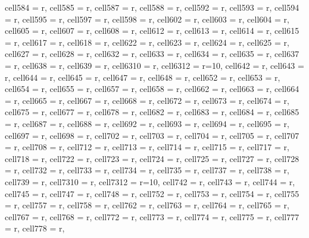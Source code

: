\begin{longtblr}[
  caption = {Linear model estimating all the considered metrics in every alternative scenario.}
]
{  cell{58}{4} = {r},
  cell{58}{5} = {r},
  cell{58}{7} = {r},
  cell{58}{8} = {r},
  cell{59}{2} = {r},
  cell{59}{3} = {r},
  cell{59}{4} = {r},
  cell{59}{5} = {r},
  cell{59}{7} = {r},
  cell{59}{8} = {r},
  cell{60}{2} = {r},
  cell{60}{3} = {r},
  cell{60}{4} = {r},
  cell{60}{5} = {r},
  cell{60}{7} = {r},
  cell{60}{8} = {r},
  cell{61}{2} = {r},
  cell{61}{3} = {r},
  cell{61}{4} = {r},
  cell{61}{5} = {r},
  cell{61}{7} = {r},
  cell{61}{8} = {r},
  cell{62}{2} = {r},
  cell{62}{3} = {r},
  cell{62}{4} = {r},
  cell{62}{5} = {r},
  cell{62}{7} = {r},
  cell{62}{8} = {r},
  cell{63}{2} = {r},
  cell{63}{3} = {r},
  cell{63}{4} = {r},
  cell{63}{5} = {r},
  cell{63}{7} = {r},
  cell{63}{8} = {r},
  cell{63}{9} = {r},
  cell{63}{10} = {r},
  cell{63}{12} = {r=10}{},
  cell{64}{2} = {r},
  cell{64}{3} = {r},
  cell{64}{4} = {r},
  cell{64}{5} = {r},
  cell{64}{7} = {r},
  cell{64}{8} = {r},
  cell{65}{2} = {r},
  cell{65}{3} = {r},
  cell{65}{4} = {r},
  cell{65}{5} = {r},
  cell{65}{7} = {r},
  cell{65}{8} = {r},
  cell{66}{2} = {r},
  cell{66}{3} = {r},
  cell{66}{4} = {r},
  cell{66}{5} = {r},
  cell{66}{7} = {r},
  cell{66}{8} = {r},
  cell{67}{2} = {r},
  cell{67}{3} = {r},
  cell{67}{4} = {r},
  cell{67}{5} = {r},
  cell{67}{7} = {r},
  cell{67}{8} = {r},
  cell{68}{2} = {r},
  cell{68}{3} = {r},
  cell{68}{4} = {r},
  cell{68}{5} = {r},
  cell{68}{7} = {r},
  cell{68}{8} = {r},
  cell{69}{2} = {r},
  cell{69}{3} = {r},
  cell{69}{4} = {r},
  cell{69}{5} = {r},
  cell{69}{7} = {r},
  cell{69}{8} = {r},
  cell{70}{2} = {r},
  cell{70}{3} = {r},
  cell{70}{4} = {r},
  cell{70}{5} = {r},
  cell{70}{7} = {r},
  cell{70}{8} = {r},
  cell{71}{2} = {r},
  cell{71}{3} = {r},
  cell{71}{4} = {r},
  cell{71}{5} = {r},
  cell{71}{7} = {r},
  cell{71}{8} = {r},
  cell{72}{2} = {r},
  cell{72}{3} = {r},
  cell{72}{4} = {r},
  cell{72}{5} = {r},
  cell{72}{7} = {r},
  cell{72}{8} = {r},
  cell{73}{2} = {r},
  cell{73}{3} = {r},
  cell{73}{4} = {r},
  cell{73}{5} = {r},
  cell{73}{7} = {r},
  cell{73}{8} = {r},
  cell{73}{9} = {r},
  cell{73}{10} = {r},
  cell{73}{12} = {r=10}{},
  cell{74}{2} = {r},
  cell{74}{3} = {r},
  cell{74}{4} = {r},
  cell{74}{5} = {r},
  cell{74}{7} = {r},
  cell{74}{8} = {r},
  cell{75}{2} = {r},
  cell{75}{3} = {r},
  cell{75}{4} = {r},
  cell{75}{5} = {r},
  cell{75}{7} = {r},
  cell{75}{8} = {r},
  cell{76}{2} = {r},
  cell{76}{3} = {r},
  cell{76}{4} = {r},
  cell{76}{5} = {r},
  cell{76}{7} = {r},
  cell{76}{8} = {r},
  cell{77}{2} = {r},
  cell{77}{3} = {r},
  cell{77}{4} = {r},
  cell{77}{5} = {r},
  cell{77}{7} = {r},
  cell{77}{8} = {r},
}
\end{longtblr}
